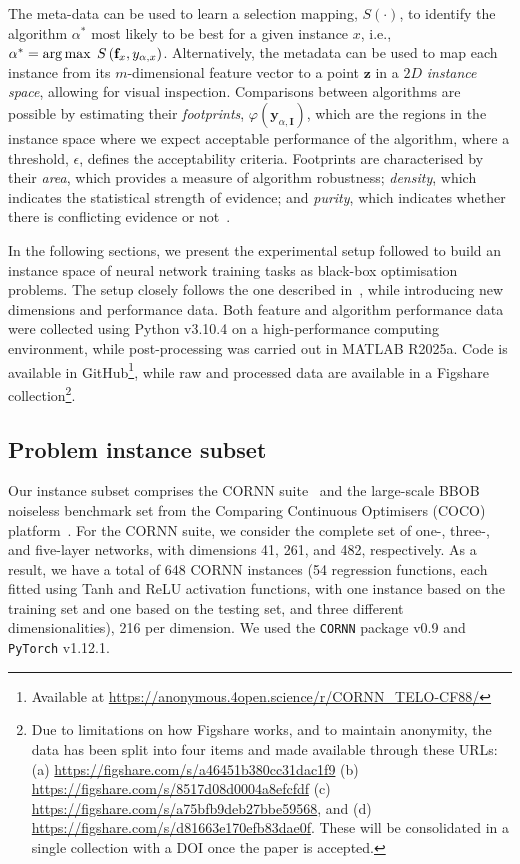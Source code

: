 \documentclass[acmsmall,screen,review,anonymous]{acmart}
\newcommand{\Ibf}{\mathbf{I}}
\newcommand{\f}{\mathbf{f}}
\newcommand{\y}{\mathbf{y}}
\newcommand{\z}{\mathbf{z}}
\begin{document}
The meta-data can be used to learn a selection mapping, $S\left(\cdot\right)$, to identify the algorithm $\alpha^{*}$ most likely to be best for a given instance $x$, i.e., $\alpha^{*}=\arg\max\hspace{1mm}S\left(\f_{x},y_{\alpha,x}\right)$. Alternatively, the metadata can be used to map each instance from its $m$-dimensional feature vector to a point $\z$ in a $2D$ \textit{instance space}, allowing for visual inspection. Comparisons between algorithms are possible by estimating their \textit{footprints}, $\varphi\left(\y_{\alpha,\Ibf}\right)$, which are the regions in the instance space where we expect acceptable performance of the algorithm, where a threshold, $\epsilon$, defines the acceptability criteria. Footprints are characterised by their \textit{area}, which provides a measure of algorithm robustness; \textit{density}, which indicates the statistical strength of evidence; and \textit{purity}, which indicates whether there is conflicting evidence or not~\cite{SmithMiles2022}.

In the following sections, we present the experimental setup followed to build an instance space of neural network training tasks as black-box optimisation problems. The setup closely follows the one described in~\cite{Malan2025}, while introducing new dimensions and performance data. Both feature and algorithm performance data were collected using Python v3.10.4 on a high-performance computing environment, while post-processing was carried out in MATLAB R2025a. Code is available in GitHub\footnote{Available at \url{https://anonymous.4open.science/r/CORNN_TELO-CF88/}}, while raw and processed data are available in a Figshare collection\footnote{Due to limitations on how Figshare works, and to maintain anonymity, the data has been split into four items and made available through these URLs:
(a) \url{https://figshare.com/s/a46451b380cc31dac1f9} (b) \url{https://figshare.com/s/8517d08d0004a8efcfdf} (c) \url{https://figshare.com/s/a75bfb9deb27bbe59568}, and (d) \url{https://figshare.com/s/d81663e170efb83dae0f}. These will be consolidated in a single collection with a DOI once the paper is accepted. }.

\subsection{Problem instance subset}
Our instance subset comprises the CORNN suite~\cite{Malan2022} and the large-scale BBOB noiseless benchmark set from the Comparing Continuous Optimisers (COCO) platform~\cite{hansen2021coco}. For the CORNN suite, we consider the complete set of one-, three-, and five-layer networks, with dimensions 41, 261, and 482, respectively. As a result, we have a total of 648 CORNN instances (54 regression functions, each fitted using Tanh and ReLU activation functions, with one instance based on the training set and one based on the testing set, and three different dimensionalities), 216 per dimension. We used the \texttt{CORNN} package v0.9 and \texttt{PyTorch} v1.12.1.
\end{document}
